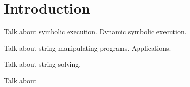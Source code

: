 \section{Introduction}
\label{sec:intro}

Talk about symbolic execution. Dynamic symbolic execution.

Talk about string-manipulating programs. Applications.

Talk about string solving.

Talk about 
